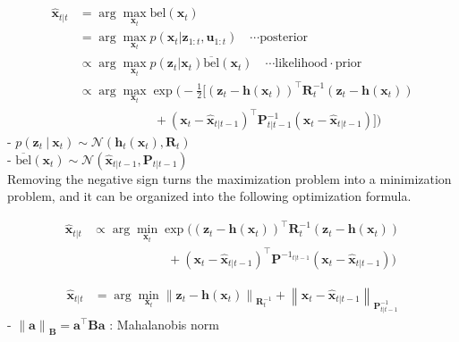 \documentclass[10pt]{article}
\begin{document}
\begin{equation} \label{eq:map1}
	\begin{aligned} 
		\hat{\mathbf{x}}_{t|t} & = \arg\max_{ \mathbf{x}_{t}} \text{bel}(\mathbf{x}_{t}) \\
		& = \arg\max_{ \mathbf{x}_{t}} p(\mathbf{x}_{t} | \mathbf{z}_{1:t}, \mathbf{u}_{1:t})  \quad \cdots \text{posterior} \\
		& \propto \arg\max_{ \mathbf{x}_{t}} p(\mathbf{z}_{t} | \mathbf{x}_{t}) \overline{\text{bel}}(\mathbf{x}_{t}) \quad \cdots \text{likelihood} \cdot \text{prior} \\
		& \propto \arg\max_{\mathbf{x}_{t}}   \exp  \bigg( -\frac{1}{2}  \bigg[ (\mathbf{z}_{t} - \mathbf{h}(\mathbf{x}_{t}))^{\intercal} \mathbf{R}_{t}^{-1} (\mathbf{z}_{t} - \mathbf{h}(\mathbf{x}_{t})) \\
		& \quad\quad\quad \quad \quad \quad + ( \mathbf{x}_{t} - \hat{\mathbf{x}}_{t|t-1})^{\intercal} \mathbf{P}_{t|t-1}^{-1} ( \mathbf{x}_{t}  - \hat{\mathbf{x}}_{t|t-1}) \bigg] \bigg)
	\end{aligned} 
\end{equation}
- $p(\mathbf{z}_{t} \ | \ \mathbf{x}_{t}) \sim \mathcal{N}( \mathbf{h}_{t}(\mathbf{x}_{t}) , \mathbf{R}_{t})$ \\
- $\overline{\text{bel}}( \mathbf{x}_{t}) \sim \mathcal{N}( \hat{\mathbf{x}}_{t|t-1}, \mathbf{P}_{t|t-1})$\\

Removing the negative sign turns the maximization problem into a minimization problem, and it can be organized into the following optimization formula.

\begin{equation} \label{eq:map2}
	\begin{aligned} 
		\hat{\mathbf{x}}_{t|t} & \propto \arg\min_{\mathbf{x}_{t}}   \exp  \bigg( (\mathbf{z}_{t} - \mathbf{h}(\mathbf{x}_{t}))^{\intercal} \mathbf{R}_{t}^{-1} (\mathbf{z}_{t} - \mathbf{h}(\mathbf{x}_{t})) \\
		& \quad\quad\quad\quad\quad\quad + ( \mathbf{x}_{t}  - \hat{\mathbf{x}}_{t|t-1} )^{\intercal} \mathbf{P}^{-1_{t|t-1}} ( \mathbf{x}_{t}  - \hat{\mathbf{x}}_{t|t-1} ) \bigg) \end{aligned} 
\end{equation}

\begin{equation} \label{eq:map3}
	\boxed{ \begin{aligned} 
			\hat{\mathbf{x}}_{t|t} & = \arg\min_{\mathbf{x}_{t}} \left\| \mathbf{z}_{t} - \mathbf{h}(\mathbf{x}_{t}) \right\|_{\mathbf{R}_{t}^{-1}} + \left\| \mathbf{x}_{t}   - \hat{\mathbf{x}}_{t|t-1} \right\|_{\mathbf{P}_{t|t-1}^{-1}} 
	\end{aligned} }
\end{equation}
- $\left\| \mathbf{a} \right\|_{\mathbf{B}} = \mathbf{a}^{\intercal}\mathbf{B}\mathbf{a}$ : Mahalanobis norm\\
\end{document}
